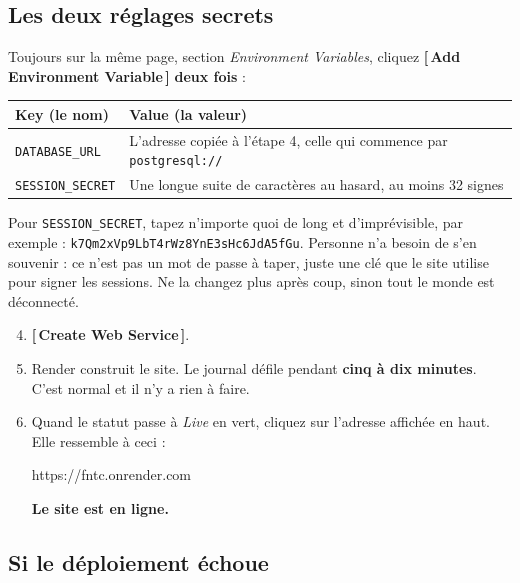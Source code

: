 \documentclass[11pt,a4paper]{article}
\newcommand{\bouton}[1]{\textbf{\textcolor{sig}{[\,#1\,]}}}
\newcommand{\champ}[1]{\textit{#1}}
\newcommand{\saisir}[1]{\texttt{#1}}
\begin{document}
\subsection{Les deux réglages secrets}

Toujours sur la même page, section \champ{Environment Variables}, cliquez
\bouton{Add Environment Variable} \textbf{deux fois} :

\begin{center}
\begin{tabularx}{\textwidth}{@{}lX@{}}
\toprule
\textbf{Key (le nom)} & \textbf{Value (la valeur)} \\
\midrule
\saisir{DATABASE\_URL} & L'adresse copiée à l'étape 4, celle qui commence par \saisir{postgresql://} \\
\saisir{SESSION\_SECRET} & Une longue suite de caractères au hasard, au moins 32 signes \\
\bottomrule
\end{tabularx}
\end{center}

\begin{conseil}
Pour \saisir{SESSION\_SECRET}, tapez n'importe quoi de long et
d'imprévisible, par exemple :
\saisir{k7Qm2xVp9LbT4rWz8YnE3sHc6JdA5fGu}. Personne n'a besoin de s'en
souvenir : ce n'est pas un mot de passe à taper, juste une clé que le site
utilise pour signer les sessions. Ne la changez plus après coup, sinon tout le
monde est déconnecté.
\end{conseil}

\begin{enumerate}\setcounter{enumi}{3}
  \item \bouton{Create Web Service}.
  \item Render construit le site. Le journal défile pendant \textbf{cinq à dix
        minutes}. C'est normal et il n'y a rien à faire.
  \item Quand le statut passe à \champ{Live} en vert, cliquez sur l'adresse
        affichée en haut. Elle ressemble à ceci :

        \begin{center}\ttfamily https://fntc.onrender.com\end{center}

        \textbf{Le site est en ligne.}
\end{enumerate}

\subsection{Si le déploiement échoue}
\end{document}
